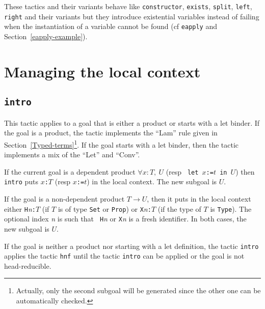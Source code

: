 \begin{coq_example*}
\begin{Variants}
  These tactics and their variants behave like \texttt{constructor},
  \texttt{exists}, \texttt{split}, \texttt{left}, \texttt{right} and
  their variants but they introduce existential variables instead of
  failing when the instantiation of a variable cannot be found (cf
  \texttt{eapply} and Section~\ref{eapply-example}).

\end{Variants}

\section{Managing the local context}

\subsection{\tt intro}
\label{intro}

This tactic applies to a goal that is either a product or starts with
a let binder. If the goal is a product, the tactic implements the
``Lam'' rule given in
Section~\ref{Typed-terms}\footnote{Actually, only the second subgoal will be
generated since the other one can be automatically checked.}.  If the
goal starts with a let binder, then the tactic implements a mix of the
``Let'' and ``Conv''.

If the current goal is a dependent product $\forall x:T,~U$ (resp {\tt
let $x$:=$t$ in $U$}) then {\tt intro} puts {\tt $x$:$T$} (resp {\tt $x$:=$t$})
 in the local context.
The new subgoal is $U$.

If the goal is a non-dependent product $T \to U$, then it puts
in the local context either {\tt H}{\it n}{\tt :$T$} (if $T$ is of
type {\tt Set} or {\tt Prop}) or {\tt X}{\it n}{\tt :$T$} (if the type
of $T$ is {\tt Type}). The optional index {\it n} is such that {\tt
H}{\it n} or {\tt X}{\it n} is a fresh identifier.
In both cases, the new subgoal is $U$.

If the goal is neither a product nor starting with a let definition,
the tactic {\tt intro} applies the tactic {\tt hnf} until the tactic
{\tt intro} can be applied or the goal is not head-reducible.


\end{coq_example*}

